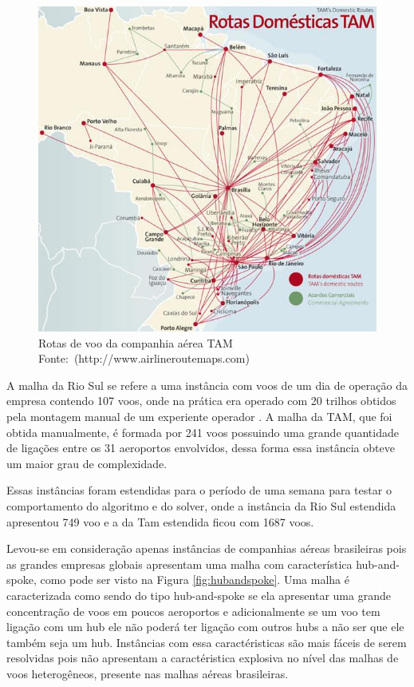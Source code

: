 \begin{figure}[h]
\centering
\caption{Rotas de voo da companhia aérea TAM \newline \mbox{Fonte:
(http://www.airlineroutemaps.com) }}

\label{fig:malhatam}
\includegraphics[scale=0.45]{./img/tam_brazilian_airlines}
\end{figure}
	
A malha da Rio Sul se refere a uma instância com voos de um dia de operação da
empresa contendo 107 voos, onde na prática era operado com 20 trilhos
obtidos pela montagem manual de um experiente operador \cite{pontes2002}. A
malha da TAM, que foi obtida manualmente, é formada por 241 voos possuindo
uma grande quantidade de ligações entre os 31 aeroportos envolvidos, dessa
forma essa instância  obteve um maior grau de complexidade.

Essas instâncias foram estendidas para o período de uma semana para testar o
comportamento do algoritmo e do solver, onde a instância da Rio Sul
estendida apresentou 749 voo e a da Tam estendida ficou com 1687 voos.
	
Levou-se em consideração apenas instâncias de companhias aéreas brasileiras pois
as grandes empresas globais apresentam uma malha com característica
hub-and-spoke, como pode ser visto na Figura \ref{fig:hubandspoke}. Uma malha é
caracterizada como sendo do tipo hub-and-spoke se ela apresentar uma grande
concentração de voos em poucos aeroportos e adicionalmente se um voo tem
ligação com um hub ele não poderá ter ligação com outros hubs a não ser que ele
também seja um hub. Instâncias com essa caractéristicas são mais fáceis de
serem resolvidas pois não apresentam a caractéristica explosiva no nível das
malhas de voos heterogêneos, presente nas malhas aéreas brasileiras.
	
